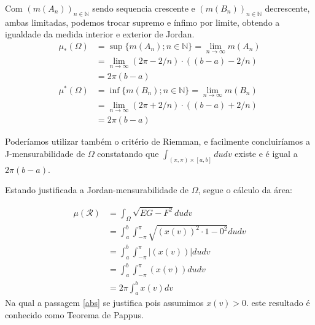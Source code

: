 \documentclass[12pt,letterpaper]{article}
\newcommand\rcur{\mathcal{R}}
\newcommand{\Int}{\displaystyle\int}
\begin{document}
Com $(m(A_n))_{n\in\mathbb{N}}$ sendo sequencia crescente e $(m(B_n))_{n\in\mathbb{N}}$ decrescente, ambas limitadas, podemos trocar supremo e ínfimo por limite, obtendo a igualdade da medida interior e exterior de Jordan.
\begin{align*}
	\mu_*(\Omega)&=\sup\{m(A_n);n\in\mathbb{N}\}=\lim_{n\to\infty}m(A_n)\\
	&=\lim_{n\to\infty}(2\pi-2/n)\cdot((b-a)-2/n)\\
	&=2\pi(b-a)\\
	\mu^{*}(\Omega)&=\inf\{m(B_n);n\in\mathbb{N}\}=\lim_{n\to\infty}m(B_n)\\
	&=\lim_{n\to\infty}(2\pi+2/n)\cdot((b-a)+2/n)\\
		&=2\pi(b-a)
\end{align*}

Poderíamos utilizar também o critério de Riemman, e facilmente concluiríamos a J-mensurabilidade de $\Omega$ constatando que $\Int_{(\pi,\pi)\times[a,b]}dudv$ existe e é igual a $2\pi(b-a)$.

Estando justificada a Jordan-mensurabilidade de $\Omega$, segue o cálculo da área:

\begin{align}
	\mu(\rcur)&=\Int_{\Omega}\sqrt{EG-F^2}dudv\nonumber\\
	&=\Int_a^b\Int_{-\pi}^{\pi}\sqrt{(x(v))^2\cdot1-0^2}dudv\nonumber\\
	&=\Int_a^b\Int_{-\pi}^{\pi}|(x(v))|dudv\nonumber\\
	&=\Int_a^b\Int_{-\pi}^{\pi}(x(v))dudv\label{abs}\\
	&=2\pi\Int_a^bx(v)dv\nonumber
\end{align}
Na qual a passagem \ref{abs} se justifica pois assumimos $x(v)>0$. este resultado é conhecido como Teorema de Pappus.
\end{document}

